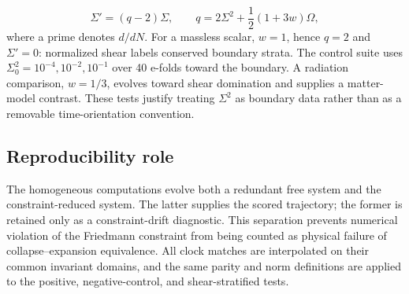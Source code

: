 \documentclass{iopjournal}
\begin{document}
\[
\Sigma'=(q-2)\Sigma,
\qquad
q=2\Sigma^2+\frac12(1+3w)\Omega,
\]
where a prime denotes $d/dN$. For a massless scalar, $w=1$, hence $q=2$ and $\Sigma'=0$: normalized shear labels conserved boundary strata. The control suite uses $\Sigma_0^2=10^{-4},10^{-2},10^{-1}$ over 40 e-folds toward the boundary. A radiation comparison, $w=1/3$, evolves toward shear domination and supplies a matter-model contrast. These tests justify treating $\Sigma^2$ as boundary data rather than as a removable time-orientation convention.

\subsection{Reproducibility role}
The homogeneous computations evolve both a redundant free system and the constraint-reduced system. The latter supplies the scored trajectory; the former is retained only as a constraint-drift diagnostic. This separation prevents numerical violation of the Friedmann constraint from being counted as physical failure of collapse--expansion equivalence. All clock matches are interpolated on their common invariant domains, and the same parity and norm definitions are applied to the positive, negative-control, and shear-stratified tests.

\end{document}
